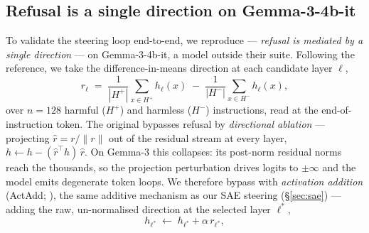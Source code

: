 
\subsection{Refusal is a single direction on Gemma-3-4b-it}
\label{sec:refusal}

To validate the steering loop end-to-end, we reproduce \citet{arditi2024refusallanguagemodelsmediated} --- \emph{refusal is mediated by a single direction} --- on Gemma-3-4b-it, a model outside their suite. Following the reference, we take the difference-in-means direction at each candidate layer $\ell$,
%
\begin{equation}
    r_\ell \;=\; \frac{1}{|H^{+}|}\!\sum_{x \in H^{+}}\! h_\ell(x) \;-\; \frac{1}{|H^{-}|}\!\sum_{x \in H^{-}}\! h_\ell(x),
    \label{eq:diffmeans}
\end{equation}
%
over $n=128$ harmful ($H^{+}$) and harmless ($H^{-}$) instructions, read at the end-of-instruction token. The original bypasses refusal by \emph{directional ablation} --- projecting $\hat r = r/\lVert r\rVert$ out of the residual stream at every layer, $h \leftarrow h - (\hat r^{\top} h)\,\hat r$. On Gemma-3 this collapses: its post-norm residual norms reach the thousands, so the projection perturbation drives logits to $\pm\infty$ and the model emits degenerate token loops. We therefore bypass with \emph{activation addition} (ActAdd; \citealp{turner2024steeringlanguagemodelsactivation}), the same additive mechanism as our SAE steering (\S\ref{sec:sae}) --- adding the raw, un-normalised direction at the selected layer $\ell^{*}$,
%
\begin{equation}
    h_{\ell^{*}} \;\leftarrow\; h_{\ell^{*}} + \alpha\, r_{\ell^{*}},
    \label{eq:actadd}
\end{equation}
%
